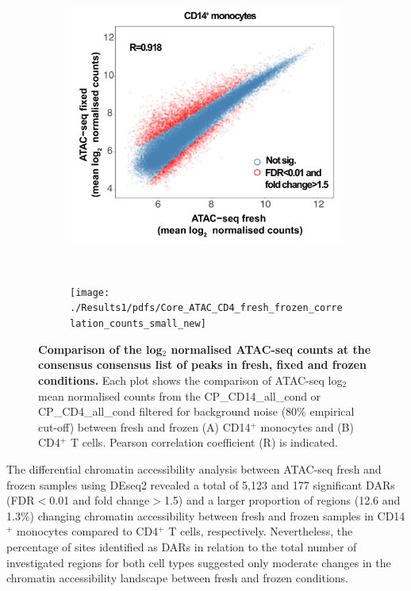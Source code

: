 \begin{figure}[H]
\centering
\begin{subfigure}[b]{0.45\textwidth}
\centering 
\includegraphics[width=\textwidth]{./Results1/pdfs/Core_ATAC_CD14_fresh_frozen_correlation_counts_small_new}
\caption{}
\end{subfigure}
~
\begin{subfigure}[b]{0.45\textwidth}
\centering 
\texttt{[image: ./Results1/pdfs/Core\_ATAC\_CD4\_fresh\_frozen\_correlation\_counts\_small\_new]}
\caption{}
\end{subfigure}
\caption[Comparison of the log$_2$ normalised ATAC-seq counts at the consensus list of peaks in fresh and frozen conditions.]{\textbf{Comparison of the log$_2$ normalised ATAC-seq counts at the consensus consensus list of peaks in fresh, fixed and frozen conditions.} Each plot shows the comparison of ATAC-seq log$_2$ mean normalised counts from the CP\_CD14\_all\_cond or CP\_CD4\_all\_cond filtered for background noise (80\% empirical cut-off) between fresh and frozen (A) CD14$^+$ monocytes and (B) CD4$^+$ T cells. Pearson correlation coefficient (R) is indicated.}
\label{figure:Core_ATAC_all-conditions_correlation}
\end{figure}
	


The differential chromatin accessibility analysis between ATAC-seq fresh and frozen samples using DEseq2 revealed a total of 5,123 and 177 significant DARs (FDR$<$0.01 and fold change$>$1.5) and a larger proportion of regions (12.6 and 1.3\%) changing chromatin accessibility between fresh and frozen samples in CD14$^+$ monocytes compared to CD4$^+$ T cells, respectively. Nevertheless, the percentage of sites identified as DARs in relation to the total number of investigated regions for both cell types suggested only moderate changes in the chromatin accessibility landscape between fresh and frozen conditions. 


